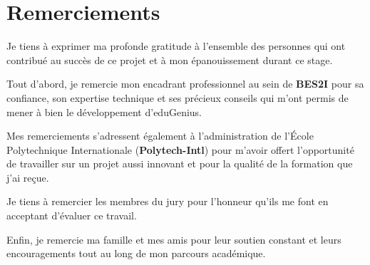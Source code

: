 \chapter*{Remerciements}
{}

Je tiens à exprimer ma profonde gratitude à l'ensemble des personnes qui ont contribué au succès de ce projet et à mon épanouissement durant ce stage.

Tout d'abord, je remercie mon encadrant professionnel au sein de \textbf{BES2I} pour sa confiance, son expertise technique et ses précieux conseils qui m'ont permis de mener à bien le développement d'eduGenius.

Mes remerciements s'adressent également à l'administration de l'École Polytechnique Internationale (\textbf{Polytech-Intl}) pour m'avoir offert l'opportunité de travailler sur un projet aussi innovant et pour la qualité de la formation que j'ai reçue.

Je tiens à remercier les membres du jury pour l'honneur qu'ils me font en acceptant d'évaluer ce travail.

Enfin, je remercie ma famille et mes amis pour leur soutien constant et leurs encouragements tout au long de mon parcours académique.
